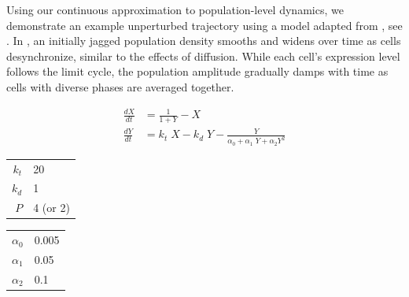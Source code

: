 Using our continuous approximation to population-level dynamics, we demonstrate an example unperturbed trajectory using a model adapted from \cite{Novak2008}, see .
In , an initially jagged population density smooths and widens over time as cells desynchronize, similar to the effects of diffusion.
While each cell's expression level follows the limit cycle, the population amplitude gradually damps with time as cells with diverse phases are averaged together.

\begin{model}
  \centering
  \begin{align*}
    \frac{dX}{dt} &= \frac{1}{1 + Y} - X \\
    \frac{dY}{dt} &= k_t \; X - k_d \; Y - \frac{Y}{\alpha_0 + \alpha_1 \; Y +
    \alpha_2 Y^2}
  \end{align*}

  \begin{supertabular}{rl}
    $k_t$ & 20 \\
    $k_d$ & 1  \\
    $P$   & 4 (or 2)  \\
    \bottomrule\end{supertabular}\hspace{3ex}
  \begin{supertabular}{rl}
    $\alpha_0$ & 0.005 \\
    $\alpha_1$ & 0.05  \\
    $\alpha_2$ & 0.1   \\
    \bottomrule\end{supertabular}
  \label{mod:novak}
\end{model}

